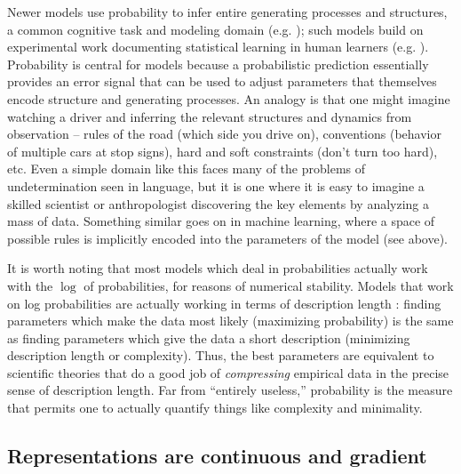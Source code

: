 \documentclass[output=paper,colorlinks,citecolor=brown
]{langscibook}
\begin{document}
Newer models use probability to infer entire generating processes and structures, a common cognitive task and modeling domain (e.g. \citealt{tenenbaum2011grow,ullman2012theory,lake2015human,goodman2011learning,lake2017building,rule2020child,kemp2008discovery,yang2022one}); such models build on experimental work documenting statistical learning in human learners (e.g. \citealt{saffran1996statistical,saffran1996word,aslin1998computation,newport2004learning,aslin2012statistical}). Probability is central for models because a probabilistic prediction essentially provides an error signal that can be used to adjust parameters that themselves encode structure and  generating processes. An analogy is that one might imagine watching a driver and inferring the relevant structures and dynamics from observation -- rules of the road (which side you drive on), conventions (behavior of multiple cars at stop signs), hard and soft constraints (don't turn too hard), etc. Even a simple domain like this faces many of the problems of undetermination seen in language, but it is one where it is easy to imagine a skilled scientist or anthropologist discovering the key elements by analyzing a mass of data. Something similar goes on in machine learning, where a space of possible rules is implicitly encoded into the parameters of the model (see above). %

It is worth noting that most models which deal in probabilities actually work with the $\log$ of probabilities, for reasons of numerical stability. Models that work on log probabilities are actually working in terms of description length \citep{shannon1948mathematical,cover1999elements}: finding parameters which make the data most likely (maximizing probability) is the same as finding parameters which give the data a short description (minimizing description length or complexity). Thus, the best parameters are equivalent to scientific theories that do a good job of \textit{compressing} empirical data in the precise sense of description length. Far from ``entirely useless,'' probability is the measure that permits one to actually quantify things like complexity and minimality. 

\subsection{Representations are continuous and gradient}
\end{document}
